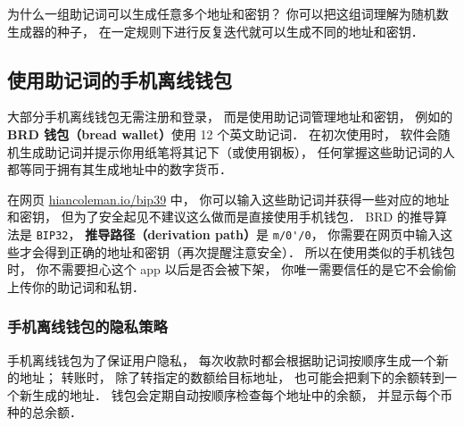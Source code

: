 为什么一组助记词可以生成任意多个地址和密钥？ 你可以把这组词理解为随机数生成器的种子， 在一定规则下进行反复迭代就可以生成不同的地址和密钥．

\subsection{使用助记词的手机离线钱包}
大部分手机离线钱包无需注册和登录， 而是使用助记词管理地址和密钥， 例如的 \textbf{BRD 钱包（bread wallet）}使用 12 个英文助记词． 在初次使用时， 软件会随机生成助记词并提示你用纸笔将其记下（或使用钢板）， 任何掌握这些助记词的人都等同于拥有其生成地址中的数字货币．

在网页 \href{https://iancoleman.io/bip39/}{hiancoleman.io/bip39} 中， 你可以输入这些助记词并获得一些对应的地址和密钥， 但为了安全起见不建议这么做而是直接使用手机钱包． BRD 的推导算法是 \verb|BIP32|， \textbf{推导路径（derivation path）}是 \verb|m/0'/0|， 你需要在网页中输入这些才会得到正确的地址和密钥（再次提醒注意安全）． 所以在使用类似的手机钱包时， 你不需要担心这个 app 以后是否会被下架， 你唯一需要信任的是它不会偷偷上传你的助记词和私钥．

\subsubsection{手机离线钱包的隐私策略}
手机离线钱包为了保证用户隐私， 每次收款时都会根据助记词按顺序生成一个新的地址； 转账时， 除了转指定的数额给目标地址， 也可能会把剩下的余额转到一个新生成的地址． 钱包会定期自动按顺序检查每个地址中的余额， 并显示每个币种的总余额．
